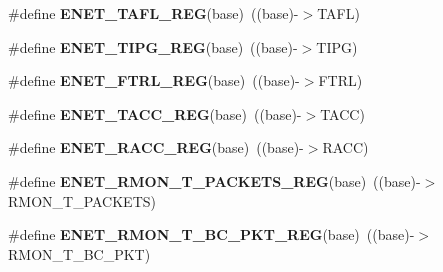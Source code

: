 \begin{DoxyCompactItemize}
\item 
\#define {\bfseries E\+N\+E\+T\+\_\+\+T\+A\+F\+L\+\_\+\+R\+EG}(base)~((base)-\/$>$T\+A\+FL)\hypertarget{group__ENET__Register__Accessor__Macros_ga2299e36b9244b500335595e9969c09e0}{}\label{group__ENET__Register__Accessor__Macros_ga2299e36b9244b500335595e9969c09e0}

\item 
\#define {\bfseries E\+N\+E\+T\+\_\+\+T\+I\+P\+G\+\_\+\+R\+EG}(base)~((base)-\/$>$T\+I\+PG)\hypertarget{group__ENET__Register__Accessor__Macros_gae0ab4d18b8cbec84d5a4e6c38c443717}{}\label{group__ENET__Register__Accessor__Macros_gae0ab4d18b8cbec84d5a4e6c38c443717}

\item 
\#define {\bfseries E\+N\+E\+T\+\_\+\+F\+T\+R\+L\+\_\+\+R\+EG}(base)~((base)-\/$>$F\+T\+RL)\hypertarget{group__ENET__Register__Accessor__Macros_gac904796a02e163868c7bcac9380d189a}{}\label{group__ENET__Register__Accessor__Macros_gac904796a02e163868c7bcac9380d189a}

\item 
\#define {\bfseries E\+N\+E\+T\+\_\+\+T\+A\+C\+C\+\_\+\+R\+EG}(base)~((base)-\/$>$T\+A\+CC)\hypertarget{group__ENET__Register__Accessor__Macros_ga8b3a63d8c694e73965419d50f822d4c7}{}\label{group__ENET__Register__Accessor__Macros_ga8b3a63d8c694e73965419d50f822d4c7}

\item 
\#define {\bfseries E\+N\+E\+T\+\_\+\+R\+A\+C\+C\+\_\+\+R\+EG}(base)~((base)-\/$>$R\+A\+CC)\hypertarget{group__ENET__Register__Accessor__Macros_ga89065ddb1bbd3913967f7fe780b68dcf}{}\label{group__ENET__Register__Accessor__Macros_ga89065ddb1bbd3913967f7fe780b68dcf}

\item 
\#define {\bfseries E\+N\+E\+T\+\_\+\+R\+M\+O\+N\+\_\+\+T\+\_\+\+P\+A\+C\+K\+E\+T\+S\+\_\+\+R\+EG}(base)~((base)-\/$>$R\+M\+O\+N\+\_\+\+T\+\_\+\+P\+A\+C\+K\+E\+TS)\hypertarget{group__ENET__Register__Accessor__Macros_gad445fc7ab0df9cd42120401bfb225eed}{}\label{group__ENET__Register__Accessor__Macros_gad445fc7ab0df9cd42120401bfb225eed}

\item 
\#define {\bfseries E\+N\+E\+T\+\_\+\+R\+M\+O\+N\+\_\+\+T\+\_\+\+B\+C\+\_\+\+P\+K\+T\+\_\+\+R\+EG}(base)~((base)-\/$>$R\+M\+O\+N\+\_\+\+T\+\_\+\+B\+C\+\_\+\+P\+KT)\hypertarget{group__ENET__Register__Accessor__Macros_ga4ff6d714ea52f88a296d1ba2fc93d84e}{}\label{group__ENET__Register__Accessor__Macros_ga4ff6d714ea52f88a296d1ba2fc93d84e}


\end{DoxyCompactItemize}
